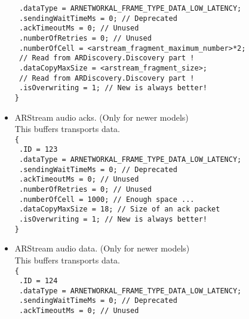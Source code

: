 \begin{itemize}
{    \texttt{  .dataType = ARNETWORKAL\_FRAME\_TYPE\_DATA\_LOW\_LATENCY;}\\
    \texttt{  .sendingWaitTimeMs = 0; // Deprecated}\\
    \texttt{  .ackTimeoutMs = 0; // Unused}\\
    \texttt{  .numberOfRetries = 0; // Unused}\\
    \texttt{  .numberOfCell = <arstream\_fragment\_maximum\_number>*2;}\\
    \texttt{                  // Read from ARDiscovery.Discovery part !}\\
    \texttt{  .dataCopyMaxSize = <arstream\_fragment\_size>;}\\
    \texttt{                     // Read from ARDiscovery.Discovery part !}\\
    \texttt{  .isOverwriting = 1; // New is always better!}\\
    \texttt{\}}
}
\item{
    ARStream audio acks. (Only for newer models)\\
    This buffers transports  data.\\
    \texttt{\{}\\
    \texttt{  .ID = 123}\\
    \texttt{  .dataType = ARNETWORKAL\_FRAME\_TYPE\_DATA\_LOW\_LATENCY;}\\
    \texttt{  .sendingWaitTimeMs = 0; // Deprecated}\\
    \texttt{  .ackTimeoutMs = 0; // Unused}\\
    \texttt{  .numberOfRetries = 0; // Unused}\\
    \texttt{  .numberOfCell = 1000; // Enough space ...}\\
    \texttt{  .dataCopyMaxSize = 18; // Size of an ack packet}\\
    \texttt{  .isOverwriting = 1; // New is always better!}\\
    \texttt{\}}
}
\item{
    ARStream audio data. (Only for newer models)\\
    This buffers transports  data.\\
    \texttt{\{}\\
    \texttt{  .ID = 124}\\
    \texttt{  .dataType = ARNETWORKAL\_FRAME\_TYPE\_DATA\_LOW\_LATENCY;}\\
    \texttt{  .sendingWaitTimeMs = 0; // Deprecated}\\
    \texttt{  .ackTimeoutMs = 0; // Unused}\\
}
\end{itemize}
